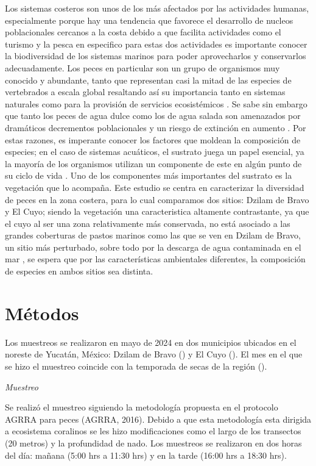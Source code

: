 \documentclass[
  authoryear,
  preprint,
  3p]{elsarticle}
\begin{document}
Los sistemas costeros son unos de los más afectados por las actividades
humanas, especialmente porque hay una tendencia que favorece el
desarrollo de nucleos poblacionales cercanos a la costa debido a que
facilita actividades como el turismo y la pesca \citep{barragán2015} en
especifico para estas dos actividades es importante conocer la
biodiversidad de los sistemas marinos para poder aprovecharlos y
conservarlos adecuadamente. Los peces en particular son un grupo de
organismos muy conocido y abundante, tanto que representan casi la mitad
de las especies de vertebrados a escala global \citep{bingpeng2018}
resaltando así su importancia tanto en sistemas naturales como para la
provisión de servicios ecosistémicos \citep{rönnbäck2007} . Se sabe sin
embargo que tanto los peces de agua dulce como los de agua salada son
amenazados por dramáticos decrementos poblacionales y un riesgo de
extinción en aumento \citep{arthington2016}. Por estas razones, es
imperante conocer los factores que moldean la composición de especies;
en el caso de sistemas acuáticos, el sustrato juega un papel esencial,
ya la mayoría de los organismos utilizan un componente de este en algún
punto de su ciclo de vida \citep{rönnbäck2007}. Uno de los componentes
más importantes del sustrato es la vegetación que lo acompaña. Este
estudio se centra en caracterizar la diversidad de peces en la zona
costera, para lo cual comparamos dos sitios: Dzilam de Bravo y El Cuyo;
siendo la vegetación una caracteristica altamente contrastante, ya que
el cuyo al ser una zona relativamente más conservada, no está asociado a
las grandes coberturas de pastos marinos como las que se ven en Dzilam
de Bravo, un sitio más perturbado, sobre todo por la descarga de agua
contaminada en el mar \citep{kantunmanzano2018}, se espera que por las
características ambientales diferentes, la composición de especies en
ambos sitios sea distinta.

\hypertarget{muxe9todos}{%
\section{Métodos}\label{muxe9todos}}

Los muestreos se realizaron en mayo de 2024 en dos municipios ubicados
en el noreste de Yucatán, México: Dzilam de Bravo () y El Cuyo (). El
mes en el que se hizo el muestreo coincide con la temporada de secas de
la región ().

\emph{Muestreo}

Se realizó el muestreo siguiendo la metodología propuesta en el
protocolo AGRRA para peces (AGRRA, 2016). Debido a que esta metodología
esta dirigida a ecosistema coralinos se les hizo modificaciones como el
largo de los transectos (20 metros) y la profundidad de nado. Los
muestreos se realizaron en dos horas del día: mañana (5:00 hrs a 11:30
hrs) y en la tarde (16:00 hrs a 18:30 hrs).
\end{document}
